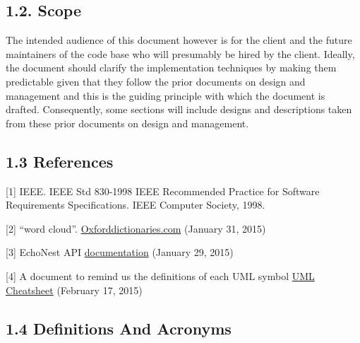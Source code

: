 \documentclass[]{article}
\begin{document}
\subsection{\textbf{1.2. Scope}}\label{scope}

The intended audience of this document however is for the client and the
future maintainers of the code base who will presumably be hired by the
client. Ideally, the document should clarify the implementation
techniques by making them predictable given that they follow the prior
documents on design and management and this is the guiding principle
with which the document is drafted. Consequently, some sections will
include designs and descriptions taken from these prior documents on
design and management.

\subsection{1.3 References}\label{references}

{[}1{]} IEEE. IEEE Std 830-1998 IEEE Recommended Practice for Software
Requirements Specifications. IEEE Computer Society, 1998.

{[}2{]} ``word cloud''.
\href{http://www.oxforddictionaries.com/us/definition/american_english/word-cloud}{Oxforddictionaries.com}
(January 31, 2015)

{[}3{]} EchoNest API
\href{http://developer.echonest.com/docs/v4/index.html\#overview}{documentation}
(January 29, 2015)

{[}4{]} A document to remind us the definitions of each UML symbol
\href{http://loufranco.com/wp-content/uploads/2012/11/cheatsheet.pdf}{UML
Cheatsheet} (February 17, 2015)

\subsection{1.4 Definitions And
Acronyms}\label{definitions-and-acronyms}
\end{document}
